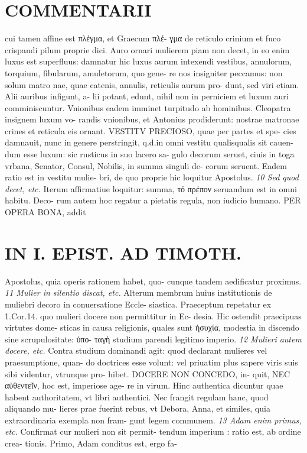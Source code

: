 \documentclass{article}
\begin{document}
\begin{pages}
\section*{COMMENTARII }
\marginpar{[ p.56 ]}\pstart cui tamen affine est πλέγμα, et Graecum πλέ- γμα de reticulo crinium et fuco crispandi pilum proprie dici.  \pend\pstart Auro ornari mulierem piam non decet, in eo enim luxus est superfluus: damnatur hic luxus aurum intexendi vestibus, annulorum, torquium, fibularum, amuletorum, quo gene- re nos insigniter peccamus: non solum matro nae, quae catenis, annulis, reticulis aurum pro- dunt, sed viri etiam. Alii auribus infigunt, a- lii potant, edunt, nihil non in perniciem et luxum auri comminiscuntur.  \pend\pstart Vnionibus eadem imminet turpitudo ab hominibus. Cleopatra insignem luxum vo- randis vnionibus, et Antonius prodiderunt: nostrae matronae crines et reticula eis ornant. VESTITV PRECIOSO, quae per partes et spe- cies damnauit, nunc in genere perstringit, q.d.in omni vestitu qualisqualis sit cauen- dum esse luxum: sic rusticus in suo lacero sa- gulo decorum seruet, ciuis in toga vrbana, Senator, Consul, Nobilis, in summa singuli de- corum seruent. Eadem ratio est in vestitu mulie- bri, de quo proprie hic loquitur Apostolus.  \pend
\textit{10 Sed quod decet, etc. }\pstart Iterum affirmatiue loquitur: summa, τό πρέπον seruandum est in omni habitu. Deco- rum autem hoc regatur a pietatis regula, non iudicio humano. PER OPERA BONA, addit  \pend
\section*{IN I. EPIST. AD TIMOTH. }
\marginpar{[ p.57 ]}\pstart Apostolus, quia operis rationem habet, quo- cunque tandem aedificatur proximus.  \pend
\textit{11 Mulier in silentio discat, etc. }\pstart Alterum membrum huius institutionis de muliebri decoro in conuersatione Eccle- siastica. Praeceptum repetatur ex 1.Cor.14. quo mulieri docere non permittitur in Ec- desia. Hic ostendit praecipuas virtutes dome- sticas in causa religionis, quales sunt ἡσυχία, modestia in discendo sine scrupulositate: ὑπο- ταγὴ studium parendi legitimo imperio.  \pend
\textit{12 Mulieri autem docere, etc. }\pstart Contra studium dominandi agit: quod declarant mulieres vel praesumptione, quan- do doctrices esse volunt: vel priuatim plus sapere viris suis sibi videntur, vtrunque pro- hibet. DOCERE NON CONCEDO, in- quit, NEC αὐθεντεῖν, hoc est, imperiose age- re in virum. Hinc authentica dicuntur quae habent authoritatem, vt libri authentici. Nec frangit regulam hanc, quod aliquando mu- lieres prae fuerint rebus, vt Debora, Anna, et similes, quia extraordinaria exempla non fram- gunt legem communem.  \pend
\textit{13 Adam enim primus, etc. }\pstart Confirmat cur mulieri non sit permit- tendum imperium : ratio est, ab ordine crea- tionis. Primo, Adam conditus est, ergo fa-  \pend

\end{pages}
\end{document}
